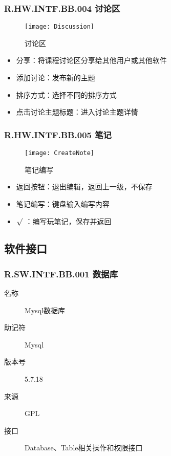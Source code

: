   \subsubsection{R.HW.INTF.BB.004 讨论区}
    \begin{figure}[H]
    \centering
    \texttt{[image: Discussion]}
    \caption{讨论区}
    \end{figure}
  \begin{itemize}
  \item 分享：将课程讨论区分享给其他用户或其他软件
  \item 添加讨论：发布新的主题
  \item 排序方式：选择不同的排序方式
  \item 点击讨论主题标题：进入讨论主题详情
  \end{itemize}
  \subsubsection{R.HW.INTF.BB.005 笔记}
  \begin{figure}[H]
  \centering
  \texttt{[image: CreateNote]}
  \caption{笔记编写}
  \end{figure}
  \begin{itemize}
  \item 返回按钮：退出编辑，返回上一级，不保存
  \item 笔记编写：键盘输入编写内容
  \item $\surd$ ：编写玩笔记，保存并返回
  \end{itemize}

  \subsection{软件接口}
    \subsubsection{R.SW.INTF.BB.001 数据库}
	   \begin{center}\begin{description}
      \item[名称] Mysql数据库
      \item[助记符] Mysql
      \item[版本号]5.7.18
	     \item[来源] GPL
	      \item[接口] Database、Table相关操作和权限接口
	     \end{description}\end{center}

